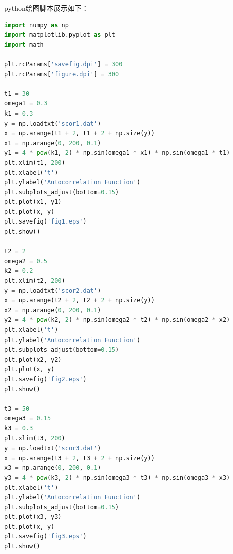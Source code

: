 \documentclass[12pt,a4paper,utf8]{ctexart}
\begin{document}
python绘图脚本展示如下：
\begin{framed}
\begin{lstlisting}[language=python]
import numpy as np
import matplotlib.pyplot as plt
import math

plt.rcParams['savefig.dpi'] = 300
plt.rcParams['figure.dpi'] = 300

t1 = 30
omega1 = 0.3
k1 = 0.3
y = np.loadtxt('scor1.dat')
x = np.arange(t1 + 2, t1 + 2 + np.size(y))
x1 = np.arange(0, 200, 0.1)
y1 = 4 * pow(k1, 2) * np.sin(omega1 * x1) * np.sin(omega1 * t1)
plt.xlim(t1, 200)
plt.xlabel('t')
plt.ylabel('Autocorrelation Function')
plt.subplots_adjust(bottom=0.15)
plt.plot(x1, y1)
plt.plot(x, y)
plt.savefig('fig1.eps')
plt.show()

t2 = 2
omega2 = 0.5
k2 = 0.2
plt.xlim(t2, 200)
y = np.loadtxt('scor2.dat')
x = np.arange(t2 + 2, t2 + 2 + np.size(y))
x2 = np.arange(0, 200, 0.1)
y2 = 4 * pow(k2, 2) * np.sin(omega2 * t2) * np.sin(omega2 * x2)
plt.xlabel('t')
plt.ylabel('Autocorrelation Function')
plt.subplots_adjust(bottom=0.15)
plt.plot(x2, y2)
plt.plot(x, y)
plt.savefig('fig2.eps')
plt.show()

t3 = 50
omega3 = 0.15
k3 = 0.3
plt.xlim(t3, 200)
y = np.loadtxt('scor3.dat')
x = np.arange(t3 + 2, t3 + 2 + np.size(y))
x3 = np.arange(0, 200, 0.1)
y3 = 4 * pow(k3, 2) * np.sin(omega3 * t3) * np.sin(omega3 * x3)
plt.xlabel('t')
plt.ylabel('Autocorrelation Function')
plt.subplots_adjust(bottom=0.15)
plt.plot(x3, y3)
plt.plot(x, y)
plt.savefig('fig3.eps')
plt.show()
\end{lstlisting}
\end{framed}
\end{document}

